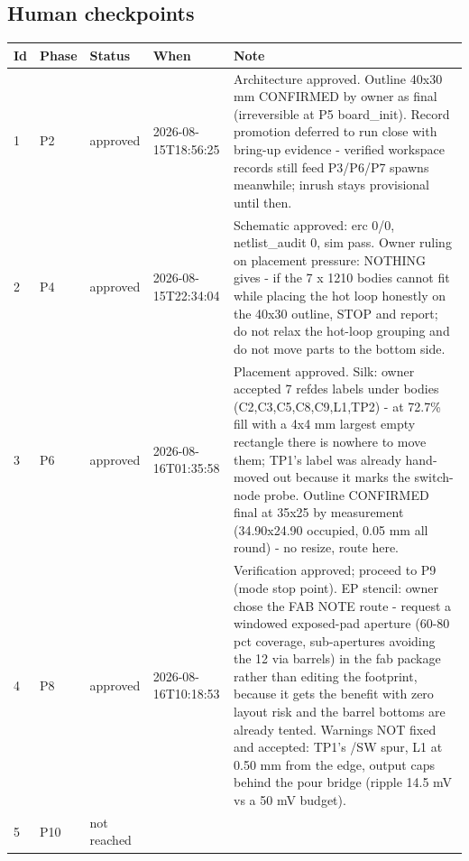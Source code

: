 \documentclass[11pt,a4paper]{article}
\begin{document}
\subsection*{Human checkpoints}
{\small
\begin{longtable}{lllp{2.6cm}p{6.4cm}}
\toprule
\textbf{Id} & \textbf{Phase} & \textbf{Status} & \textbf{When} & \textbf{Note} \\
\midrule
\endhead
1 & P2 & approved & 2026-08-15T18:56:25 & Architecture approved. Outline 40x30 mm CONFIRMED by owner as final (irreversible at P5 board\_init). Record promotion deferred to run close with bring-up evidence - verified workspace records still feed P3/P6/P7 spawns meanwhile; inrush stays provisional until then. \\
2 & P4 & approved & 2026-08-15T22:34:04 & Schematic approved: erc 0/0, netlist\_audit 0, sim pass. Owner ruling on placement pressure: NOTHING gives - if the 7 x 1210 bodies cannot fit while placing the hot loop honestly on the 40x30 outline, STOP and report; do not relax the hot-loop grouping and do not move parts to the bottom side. \\
3 & P6 & approved & 2026-08-16T01:35:58 & Placement approved. Silk: owner accepted 7 refdes labels under bodies (C2,C3,C5,C8,C9,L1,TP2) - at 72.7\% fill with a 4x4 mm largest empty rectangle there is nowhere to move them; TP1's label was already hand-moved out because it marks the switch-node probe. Outline CONFIRMED final at 35x25 by measurement (34.90x24.90 occupied, 0.05 mm all round) - no resize, route here. \\
4 & P8 & approved & 2026-08-16T10:18:53 & Verification approved; proceed to P9 (mode stop point). EP stencil: owner chose the FAB NOTE route - request a windowed exposed-pad aperture (60-80 pct coverage, sub-apertures avoiding the 12 via barrels) in the fab package rather than editing the footprint, because it gets the benefit with zero layout risk and the barrel bottoms are already tented. Warnings NOT fixed and accepted: TP1's /SW spur, L1 at 0.50 mm from the edge, output caps behind the pour bridge (ripple 14.5 mV vs a 50 mV budget). \\
5 & P10 & not reached &  &  \\
\bottomrule
\end{longtable}
}
\end{document}
